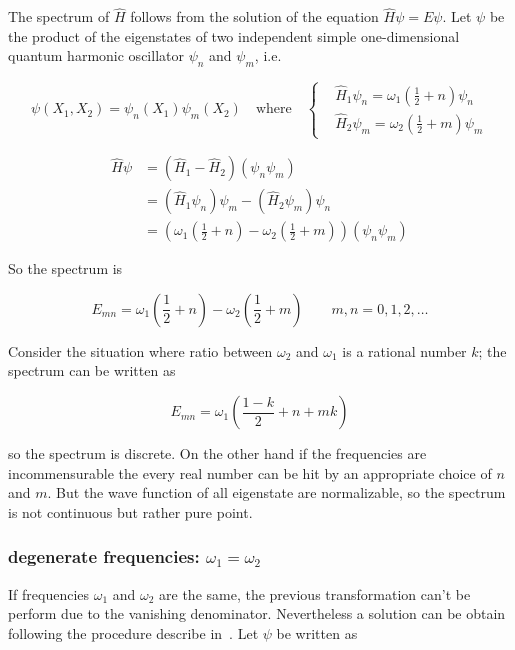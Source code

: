 The spectrum of $\hat{H}$ follows from the solution of the equation
$\hat{H} \psi = E \psi$. Let $\psi$ be the product of the eigenstates of two
independent simple one-dimensional quantum harmonic oscillator $\psi_n$ and
$\psi_m$, i.e.

\begin{equation*}
  \psi(X_1, X_2) = \psi_n(X_1) \psi_m(X_2)
  \quad \text{where} \quad
  \begin{cases}
    &\hat{H}_1\psi_n = \omega_1 \left( \frac{1}{2} + n \right)\psi_n \\
    &\hat{H}_2\psi_m = \omega_2 \left( \frac{1}{2} + m \right)\psi_m
  \end{cases}
\end{equation*}

\begin{align*}
  \hat{H} \psi
  &= \left(\hat{H}_1 - \hat{H}_2\right) \left(\psi_n \psi_m\right) \\
  &= \left(\hat{H}_1\psi_n\right)\psi_m - \left(\hat{H}_2\psi_m\right)\psi_n \\
  &= \left(
    \omega_1\left(\frac{1}{2} + n\right) -
    \omega_2\left(\frac{1}{2} + m\right)
     \right) \left(\psi_n\psi_m\right)
\end{align*}



So the spectrum is

\begin{equation}
  E_{mn} =
  \omega_1 \left( \frac{1}{2} + n \right) -
  \omega_2 \left( \frac{1}{2} + m \right)
  \qquad m,n = 0,1,2,\ldots
\end{equation}

Consider the situation where ratio between $\omega_2$ and $\omega_1$ is a
rational number $k$; the spectrum can be written as

\begin{equation*}
  E_{mn} = \omega_1 \left( \frac{1-k}{2} + n + mk \right)
\end{equation*}

so the spectrum is discrete. On the other hand if the frequencies are
incommensurable the every real number can be hit by an appropriate choice of
$n$ and $m$. But the wave function of all eigenstate are normalizable, so the
spectrum is not continuous but rather pure point.


\subsubsection{degenerate frequencies: $\omega_1 = \omega_2$}
If frequencies $\omega_1$ and $\omega_2$ are the same, the previous
transformation can't be perform due to the vanishing denominator. Nevertheless a
solution can be obtain following the procedure describe in~\cite{PU50,
Bolonek06}. Let $\psi$ be written as

